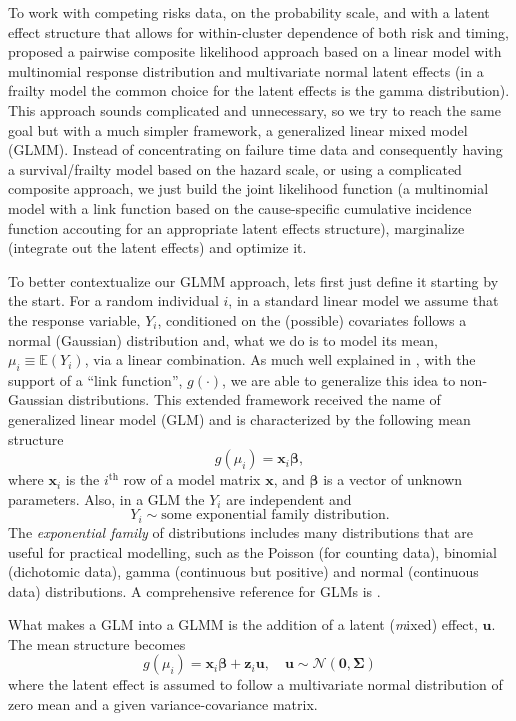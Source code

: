 To work with competing risks data, on the probability scale, and with a
latent effect structure that allows for within-cluster dependence of
both risk and timing,  proposed a pairwise composite
likelihood approach based on a linear model with multinomial response
distribution and multivariate normal latent effects (in a frailty model
the common choice for the latent effects is the gamma distribution).
This approach sounds complicated and unnecessary, so we try to reach the
same goal but with a much simpler framework, a generalized linear mixed
model (GLMM). Instead of concentrating on failure time data and
consequently having a survival/frailty model based on the hazard scale,
or using a complicated composite approach, we just build the joint
likelihood function (a multinomial model with a link function based on
the cause-specific cumulative incidence function accouting for an
appropriate latent effects structure), marginalize (integrate out the
latent effects) and optimize it.

To better contextualize our GLMM approach, lets first just define it
starting by the start. For a random individual \(i\), in a standard
linear model we assume that the response variable, \(Y_{i}\),
conditioned on the (possible) covariates follows a normal (Gaussian)
distribution and, what we do is to model its mean, \(\mu_{i} \equiv
\mathbb{E}(Y_{i})\), via a linear combination. As much well explained in
, with the support of a ``link function'',
\(g(\cdot)\), we are able to generalize this idea to non-Gaussian
distributions. This extended framework received the name of generalized
linear model (GLM) and is characterized by the following mean structure
\[
 g(\mu_{i}) = \bm{x}_{i}\bm{\beta},
\]
where \(\bm{x}_{i}\) is the \(i^\text{th}\) row of a model matrix
\(\bm{x}\), and \(\bm{\beta}\) is a vector of unknown parameters.
Also, in a GLM the \(Y_{i}\) are independent and
\[
  Y_{i} \sim \text{some exponential family distribution}.
\]
The \textit{exponential family} of distributions includes many
distributions that are useful for practical modelling, such as the
Poisson (for counting data), binomial (dichotomic data), gamma
(continuous but positive) and normal (continuous data) distributions. A
comprehensive reference for GLMs is .

What makes a GLM into a GLMM is the addition of a latent
(\textit{m}ixed) effect, \(\mathbf{u}\). The mean structure becomes
\[
  g(\mu_{i}) = \bm{x}_{i}\bm{\beta} + \mathbf{z}_{i}\mathbf{u},
  \quad \mathbf{u} \sim \mathcal{N}(\mathbf{0},\bm{\Sigma})
\]
where the latent effect is assumed to follow a multivariate normal
distribution of zero mean and a given variance-covariance matrix.

